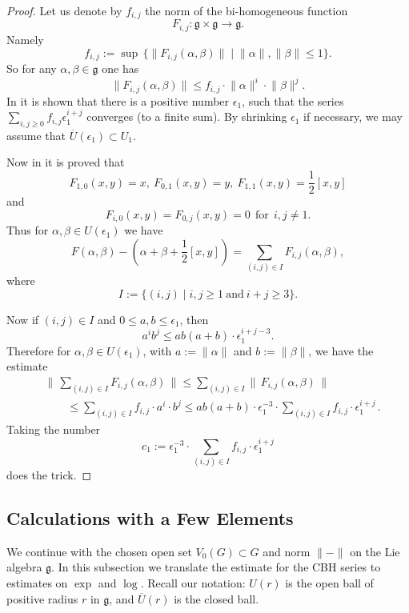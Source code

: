 \documentclass[10pt, a4paper]{amsart}
\theoremstyle{definition}
\numberwithin{equation}{section}
\newcommand{\ol}{\overline}
\newcommand{\mfrak}[1]{\mathfrak{#1}}
\newcommand{\smfrac}[2]{{\textstyle \frac{#1}{#2}}}
\newcommand{\norm}[1]{\lVert #1 \rVert}
\newcommand{\Norm}[1]{\bigl\lVert\, #1 \, \bigr\rVert}
\newcommand{\g}{\mfrak{g}}
\begin{document}
\begin{proof}
Let us denote by 
$f_{i, j}$ the norm of the bi-homogeneous function 
\[ F_{i, j} : \g \times \g \to \g . \]
Namely
\[ f_{i, j} := \sup \, \{ \norm{F_{i, j}(\alpha, \beta)} \mid 
\norm{\alpha}, \norm{\beta} \leq 1 \} . \]
So for any $\alpha, \beta \in \g$ one has
\[ \norm{F_{i, j}(\alpha, \beta)} \leq 
f_{i, j} \cdot \norm{\alpha}^i \cdot \norm{\beta}^j . \]
In \cite[Section II.7.2]{Bo} it is shown that there is a positive
number $\epsilon_1$, such that the series 
$\sum_{i, j \geq 0} f_{i,j} \epsilon_1^{i+j}$
converges (to a finite sum). 
By shrinking $\epsilon_1$ if necessary, we may assume that
$\ol{U}(\epsilon_1 ) \subset U_1$.

Now in \cite[Section II.6.4]{Bo} it is proved that 
\[ F_{1,0}(x, y) = x, \ F_{0, 1}(x, y) = y, \
F_{1, 1}(x,y) = \smfrac{1}{2} [x,y] \]
and 
\[ F_{i, 0}(x,y) = F_{0, j}(x,y) = 0 \ \ \text{for} \ \ i, j \neq 1 . \]
Thus for $\alpha, \beta \in U(\epsilon_1)$ we have
\[  F(\alpha, \beta) - (\alpha + \beta + \smfrac{1}{2} [x,y]) = 
\sum\limits_{(i, j) \in I} F_{i, j}(\alpha, \beta) , \]
where
\[ I := \{ (i, j) \mid i, j \geq 1 \ \text{and} \ i + j \geq 3 \} . \]

Now if $(i, j) \in I$ and $0 \leq a, b \leq \epsilon_1$, then 
\[ a^i b^j \leq a b (a+b) \cdot \epsilon_1^{i + j -3} . \]
Therefore for $\alpha, \beta \in U(\epsilon_1)$, with
$a := \norm{\alpha}$ and $b := \norm{\beta}$, we have the estimate
\[ \begin{aligned}
& \Norm{ \sum\limits_{(i, j) \in I} F_{i, j}(\alpha, \beta) }
\leq \sum\limits_{(i, j) \in I} \Norm{ F_{i, j}(\alpha, \beta) } \\
& \qquad \leq \sum\limits_{(i, j) \in I} f_{i,j} \cdot a^i \cdot b^j
\leq a b (a+b) \cdot \epsilon_1^{-3} \cdot  
\sum\limits_{(i, j) \in I} f_{i,j} \cdot \epsilon_1^{i+j} \, .
\end{aligned} \]
Taking the number
\[ c_1 := \epsilon_1^{-3} \cdot  
\sum\limits_{(i, j) \in I} f_{i,j} \cdot \epsilon_1^{i+j} \]
does the trick.
\end{proof}

\subsection{Calculations with a Few Elements}
We continue with the chosen open set $V_0(G) \subset G$ and norm $\norm{-}$ on
the Lie algebra $\g$.
In this subsection we translate the estimate for the CBH series to estimates on
$\exp$ and $\log$.
Recall our notation: $U(r)$ is the open ball of positive radius $r$ in $\g$, and
$\ol{U}(r)$ is the closed ball.
\end{document}
